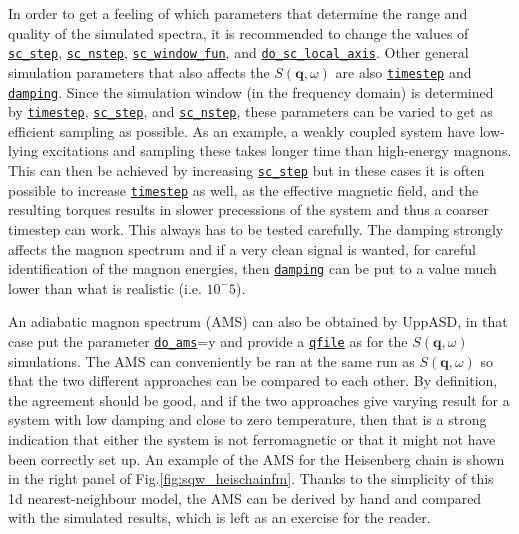 \documentclass[11pt,fleqn,a4]{book} %
\newcommand{\rkeyword}[1]{\hyperref[#1]{\texttt{#1}}}
\begin{document}
In order to get a feeling of which parameters that determine the range and quality of the simulated spectra, it is recommended to change the values of \rkeyword{sc_step}, \rkeyword{sc_nstep}, \rkeyword{sc_window_fun}, and \rkeyword{do_sc_local_axis}. Other general simulation parameters that also affects the $S(\mathbf{q},\omega)$ are also \rkeyword{timestep} and \rkeyword{damping}. Since the simulation window (in the frequency domain) is determined by \rkeyword{timestep}, \rkeyword{sc_step}, and \rkeyword{sc_nstep}, these parameters can be varied to get as efficient sampling as possible. As an example, a weakly coupled system have low-lying excitations and sampling these takes longer time than high-energy magnons. This can then be achieved by increasing \rkeyword{sc_step} but in these cases it is often possible to increase \rkeyword{timestep} as well, as the effective magnetic field, and the resulting torques results in slower precessions of the system and thus a coarser timestep can work. This always has to be tested carefully. The damping strongly affects the magnon spectrum and if a very clean signal is wanted, for careful identification of the magnon energies, then \rkeyword{damping} can be put to a value much lower than what is realistic (i.e. $10^-5$).
\par
An adiabatic magnon spectrum (AMS) can also be obtained by UppASD, in that case put the parameter \rkeyword{do_ams}=y and provide a \rkeyword{qfile} as for the $S(\mathbf{q},\omega)$ simulations. The AMS can conveniently be ran at the same run as $S(\mathbf{q},\omega)$ so that the two different approaches can be compared to each other. By definition, the agreement should be good, and if the two approaches give varying result for a system with low damping and close to zero temperature, then that is a strong indication that either the system is not ferromagnetic or that it might not have been correctly set up. An example of the AMS for the Heisenberg chain is shown in the right panel of Fig.\ref{fig:sqw_heischainfm}. Thanks to the simplicity of this 1d nearest-neighbour model, the AMS can be derived by hand and compared with the simulated results, which is left as an exercise for the reader.
%
\end{document}
